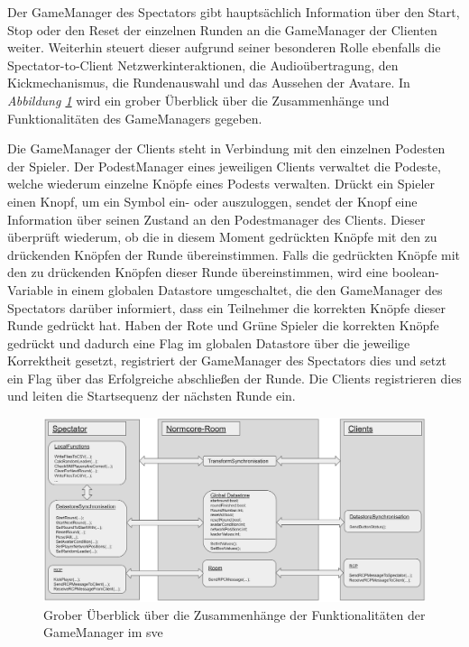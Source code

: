 \documentclass[a4paper,11pt]{article}%
\renewcommand{\\}{\vspace*{0.5\baselineskip} \newline}
\begin{document}
Der GameManager des Spectators gibt hauptsächlich Information über den Start, Stop oder den Reset der einzelnen Runden an die GameManager der Clienten weiter. Weiterhin steuert dieser aufgrund seiner besonderen Rolle ebenfalls die Spectator-to-Client Netzwerkinteraktionen, die Audioübertragung, den Kickmechanismus, die Rundenauswahl und das Aussehen der Avatare.
In \textit{Abbildung \ref{GameManagerClientSpectator}} wird ein grober Überblick über die Zusammenhänge und Funktionalitäten des GameManagers gegeben.

Die GameManager der Clients steht in Verbindung mit den einzelnen Podesten der Spieler. Der PodestManager eines jeweiligen Clients verwaltet die Podeste, welche wiederum einzelne Knöpfe eines Podests verwalten. 
Drückt ein Spieler einen Knopf, um ein Symbol ein- oder auszuloggen, sendet der Knopf eine Information über seinen Zustand an den Podestmanager des Clients. Dieser überprüft wiederum, ob die in diesem Moment gedrückten Knöpfe mit den zu drückenden Knöpfen der Runde übereinstimmen. Falls die gedrückten Knöpfe mit den zu drückenden Knöpfen dieser Runde übereinstimmen, wird eine boolean-Variable in einem globalen Datastore umgeschaltet, die den GameManager des Spectators darüber informiert, dass ein Teilnehmer die korrekten Knöpfe dieser Runde gedrückt hat. Haben der \dq{}Rote und Grüne\dq{} Spieler die korrekten Knöpfe gedrückt und dadurch eine Flag im globalen Datastore über die jeweilige Korrektheit gesetzt, registriert der GameManager des Spectators dies und setzt ein Flag über das Erfolgreiche abschließen der Runde. Die Clients registrieren dies und leiten die Startsequenz der nächsten Runde ein. 

\begin{figure}[H]
		\begin{footnotesize}
		\centering
			\includegraphics[width=\textwidth]{Abbildungen/GameManagerClientSpectator.jpg}
			\caption[Funktionalitäten des GameManager]{Grober Überblick über die Zusammenhänge der Funktionalitäten der GameManager im \ac{sve}}
			\label{GameManagerClientSpectator}
		\end{footnotesize}
	\end{figure}
\end{document}
